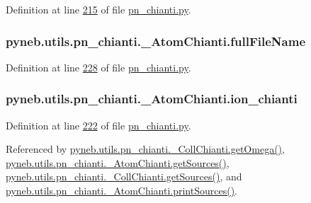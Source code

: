 Definition at line \hyperlink{pn__chianti_8py_source_l00215}{215} of file \hyperlink{pn__chianti_8py_source}{pn\+\_\+chianti.\+py}.

\hypertarget{classpyneb_1_1utils_1_1pn__chianti_1_1___atom_chianti_ac091a3412fff7c4af350dbbe6b604082}{}
\subsubsection[{full\+File\+Name}]{\setlength{\rightskip}{0pt plus 5cm}pyneb.\+utils.\+pn\+\_\+chianti.\+\_\+\+Atom\+Chianti.\+full\+File\+Name}\label{classpyneb_1_1utils_1_1pn__chianti_1_1___atom_chianti_ac091a3412fff7c4af350dbbe6b604082}


Definition at line \hyperlink{pn__chianti_8py_source_l00228}{228} of file \hyperlink{pn__chianti_8py_source}{pn\+\_\+chianti.\+py}.

\hypertarget{classpyneb_1_1utils_1_1pn__chianti_1_1___atom_chianti_a97865c9f8fcd274072335cc71fc746a3}{}
\subsubsection[{ion\+\_\+chianti}]{\setlength{\rightskip}{0pt plus 5cm}pyneb.\+utils.\+pn\+\_\+chianti.\+\_\+\+Atom\+Chianti.\+ion\+\_\+chianti}\label{classpyneb_1_1utils_1_1pn__chianti_1_1___atom_chianti_a97865c9f8fcd274072335cc71fc746a3}


Definition at line \hyperlink{pn__chianti_8py_source_l00222}{222} of file \hyperlink{pn__chianti_8py_source}{pn\+\_\+chianti.\+py}.



Referenced by \hyperlink{pn__chianti_8py_source_l00484}{pyneb.\+utils.\+pn\+\_\+chianti.\+\_\+\+Coll\+Chianti.\+get\+Omega()}, \hyperlink{pn__chianti_8py_source_l00373}{pyneb.\+utils.\+pn\+\_\+chianti.\+\_\+\+Atom\+Chianti.\+get\+Sources()}, \hyperlink{pn__chianti_8py_source_l00540}{pyneb.\+utils.\+pn\+\_\+chianti.\+\_\+\+Coll\+Chianti.\+get\+Sources()}, and \hyperlink{pn__chianti_8py_source_l00384}{pyneb.\+utils.\+pn\+\_\+chianti.\+\_\+\+Atom\+Chianti.\+print\+Sources()}.

